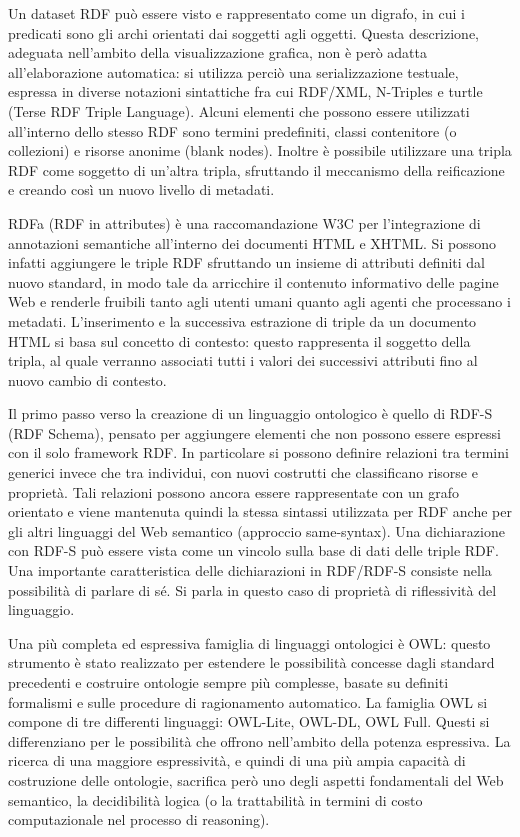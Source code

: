 \documentclass[Lau,binding=0.6cm,noexaminfo]{sapthesis}
\begin{document}
Un dataset RDF può essere visto e rappresentato come un digrafo, in cui i predicati sono gli archi orientati dai soggetti agli oggetti. Questa descrizione, adeguata nell'ambito della visualizzazione grafica, non è però adatta all'elaborazione automatica: si utilizza perciò una serializzazione testuale, espressa in diverse notazioni sintattiche fra cui RDF/XML, N-Triples e turtle (Terse RDF Triple Language).
Alcuni elementi che possono essere utilizzati all'interno dello stesso RDF sono termini predefiniti, classi contenitore (o collezioni) e risorse anonime (blank nodes). Inoltre è possibile utilizzare una tripla RDF come soggetto di un'altra tripla, sfruttando il meccanismo della reificazione e creando così un nuovo livello di metadati.\medskip

RDFa (RDF in attributes) è una raccomandazione W3C per l'integrazione di annotazioni semantiche all'interno dei documenti HTML e XHTML. Si possono infatti aggiungere le triple RDF sfruttando un insieme di attributi definiti dal nuovo standard, in modo tale da arricchire il contenuto informativo delle pagine Web e renderle fruibili tanto agli utenti umani quanto agli agenti che processano i metadati.
L'inserimento e la successiva estrazione di triple da un documento HTML si basa sul concetto di contesto: questo rappresenta il soggetto della tripla, al quale verranno associati tutti i valori dei successivi attributi fino al nuovo cambio di contesto.\medskip

Il primo passo verso la creazione di un linguaggio ontologico è quello di RDF-S (RDF Schema), pensato per aggiungere elementi che non possono essere espressi con il solo framework RDF. In particolare si possono definire relazioni tra termini generici invece che tra individui, con nuovi costrutti che classificano risorse e proprietà.
Tali relazioni possono ancora essere rappresentate con un grafo orientato e viene mantenuta quindi la stessa sintassi utilizzata per RDF anche per gli altri linguaggi del Web semantico (approccio same-syntax). Una dichiarazione con RDF-S può essere vista come un vincolo sulla base di dati delle triple RDF. Una importante caratteristica delle dichiarazioni in RDF/RDF-S consiste nella possibilità di parlare di sé. Si parla in questo caso di proprietà di riflessività del linguaggio.\medskip

Una più completa ed espressiva famiglia di linguaggi ontologici è OWL: questo strumento è stato realizzato per estendere le possibilità concesse dagli standard precedenti e costruire ontologie sempre più complesse, basate su definiti formalismi e sulle procedure di ragionamento automatico. La famiglia OWL si compone di tre differenti linguaggi: OWL-Lite, OWL-DL, OWL Full.
Questi si differenziano per le possibilità che offrono nell'ambito della potenza espressiva. La ricerca di una maggiore espressività, e quindi di una più ampia capacità di costruzione delle ontologie, sacrifica però uno degli aspetti fondamentali del Web semantico, la decidibilità logica (o la trattabilità in termini di costo computazionale nel processo di reasoning).\medskip
\end{document}
